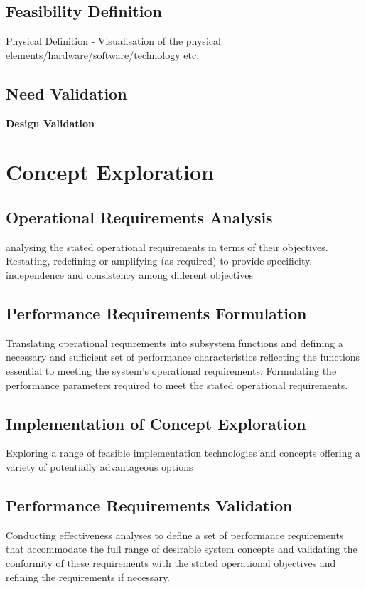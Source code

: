 \documentclass[a4paper,11pt,fleqn]{report}
\begin{document}
\subsection{Feasibility Definition}
Physical Definition - Visualisation of the physical elements/hardware/software/technology
etc.

\subsection{Need Validation}
\textbf{Design Validation}

\section{Concept Exploration}
\subsection{Operational Requirements Analysis}
analysing the stated operational requirements in terms of their
objectives. Restating, redefining or amplifying (as required) to provide
specificity, independence and consistency among different
objectives

\subsection{Performance Requirements Formulation}
Translating operational requirements into subsystem functions and defining a necessary and sufficient set of performance characteristics reflecting the functions essential to meeting the system’s operational requirements. Formulating the performance parameters required to meet the stated operational requirements.

\subsection{Implementation of Concept Exploration}
Exploring a range of feasible implementation technologies and concepts offering a variety of potentially advantageous options 

\subsection{Performance Requirements Validation}
Conducting effectiveness analyses to define a set of performance requirements that accommodate the full range of desirable system concepts and validating the conformity of these requirements with the stated operational objectives and refining the requirements if necessary. 
\end{document}
